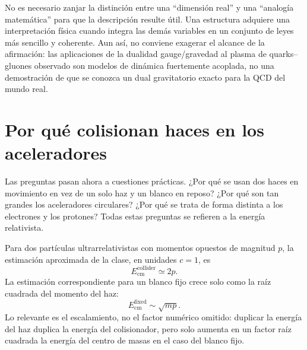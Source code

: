 No es necesario zanjar la distinción entre una ``dimensión real'' y una ``analogía matemática'' para que la descripción resulte útil. Una estructura adquiere una interpretación física cuando integra las demás variables en un conjunto de leyes más sencillo y coherente. Aun así, no conviene exagerar el alcance de la afirmación: las aplicaciones de la dualidad gauge/gravedad al plasma de quarks--gluones observado son modelos de dinámica fuertemente acoplada, no una demostración de que se conozca un dual gravitatorio exacto para la QCD del mundo real.

\section{Por qué colisionan haces en los aceleradores}

Las preguntas pasan ahora a cuestiones prácticas. ¿Por qué se usan dos haces en movimiento en vez de un solo haz y un blanco en reposo? ¿Por qué son tan grandes los aceleradores circulares? ¿Por qué se trata de forma distinta a los electrones y los protones? Todas estas preguntas se refieren a la energía relativista.

\begin{classroomqa}\end{classroomqa}

Para dos partículas ultrarrelativistas con momentos opuestos de magnitud \(p\), la estimación aproximada de la clase, en unidades \(c=1\), es
\begin{equation}
E_{\mathrm{cm}}^{\mathrm{collider}}\simeq 2p.
\end{equation}
La estimación correspondiente para un blanco fijo crece solo como la raíz cuadrada del momento del haz:
\begin{equation}
E_{\mathrm{cm}}^{\mathrm{fixed}}\sim \sqrt{mp}.
\end{equation}
Lo relevante es el escalamiento, no el factor numérico omitido: duplicar la energía del haz duplica la energía del colisionador, pero solo aumenta en un factor raíz cuadrada la energía del centro de masas en el caso del blanco fijo.

